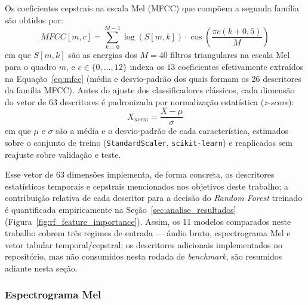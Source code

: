 \documentclass[12pt,a4paper]{article}
\begin{document}
\noindent
Os coeficientes cepstrais na escala Mel (MFCC) que compõem a segunda família
são obtidos por:
\begin{equation}
\label{eq:mfcc}
MFCC[m,c] = \sum_{k=0}^{M-1}\log(S[m,k])\cdot
\cos\!\left(\frac{\pi c(k+0{,}5)}{M}\right)
\end{equation}
\noindent
em que $S[m,k]$ são as energias dos $M=40$ filtros triangulares na escala
Mel para o quadro $m$, e $c \in \{0,\dots,12\}$ indexa os $13$ coeficientes
efetivamente extraídos na Equação~\ref{eq:mfcc} (média e desvio-padrão dos
quais formam os \num{26} descritores da família MFCC). Antes do ajuste dos
classificadores clássicos, cada dimensão do vetor de \num{63} descritores é
padronizada por normalização estatística (\textit{z-score}):
\begin{equation}
\label{eq:zscore}
X_{norm} = \frac{X - \mu}{\sigma}
\end{equation}
\noindent
em que $\mu$ e $\sigma$ são a média e o desvio-padrão de cada
característica, estimados sobre o conjunto de treino (\texttt{StandardScaler},
\texttt{scikit-learn}) e reaplicados sem reajuste sobre validação e teste.

\noindent
Esse vetor de \num{63} dimensões implementa, de forma concreta, os
descritores estatísticos temporais e cepstrais mencionados nos objetivos deste
trabalho; a contribuição relativa de cada descritor para a decisão do
\textit{Random Forest} treinado é quantificada empiricamente na
Seção~\ref{sec:analise_resultados}
(Figura~\ref{fig:rf_feature_importance}). Assim, os \num{11} modelos
comparados neste trabalho cobrem três regimes de entrada --- áudio bruto,
espectrograma Mel e vetor tabular temporal/cepstral; os descritores adicionais
implementados no repositório, mas não consumidos nesta rodada de
\textit{benchmark}, são resumidos adiante nesta seção.

\subsubsection*{Espectrograma Mel}
\end{document}
